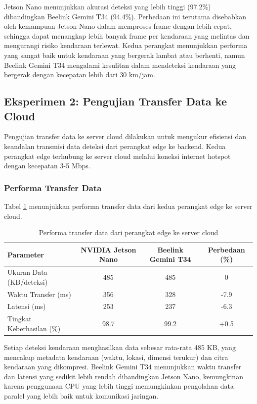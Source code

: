 Jetson Nano menunjukkan akurasi deteksi yang lebih tinggi (97.2\%) dibandingkan Beelink Gemini T34 (94.4\%). Perbedaan ini terutama disebabkan oleh kemampuan Jetson Nano dalam memproses frame dengan lebih cepat, sehingga dapat menangkap lebih banyak frame per kendaraan yang melintas dan mengurangi risiko kendaraan terlewat. Kedua perangkat menunjukkan performa yang sangat baik untuk kendaraan yang bergerak lambat atau berhenti, namun Beelink Gemini T34 mengalami kesulitan dalam mendeteksi kendaraan yang bergerak dengan kecepatan lebih dari 30 km/jam.

\subsection{Eksperimen 2: Pengujian Transfer Data ke Cloud}
\label{sec:eksperimen2}

Pengujian transfer data ke server cloud dilakukan untuk mengukur efisiensi dan keandalan transmisi data deteksi dari perangkat edge ke backend. Kedua perangkat edge terhubung ke server cloud melalui koneksi internet hotspot dengan kecepatan 3-5 Mbps.

\subsubsection{Performa Transfer Data}

Tabel \ref{tab:data_transfer} menunjukkan performa transfer data dari kedua perangkat edge ke server cloud.

\begin{table}[htbp]
  \centering
  \begin{tabular}{|l|c|c|c|}
  \hline
  \rowcolor[HTML]{C0C0C0}
  \textbf{Parameter} & \textbf{NVIDIA Jetson Nano} & \textbf{Beelink Gemini T34} & \textbf{Perbedaan (\%)} \\
  \hline
  Ukuran Data (KB/deteksi) & 485 & 485 & 0 \\
  \hline
  Waktu Transfer (ms) & 356 & 328 & -7.9 \\
  \hline
  Latensi (ms) & 253 & 237 & -6.3 \\
  \hline
  Tingkat Keberhasilan (\%) & 98.7 & 99.2 & +0.5 \\
  \hline
  \end{tabular}
  \caption{Performa transfer data dari perangkat edge ke server cloud}
  \label{tab:data_transfer}
\end{table}

Setiap deteksi kendaraan menghasilkan data sebesar rata-rata 485 KB, yang mencakup metadata kendaraan (waktu, lokasi, dimensi terukur) dan citra kendaraan yang dikompresi. Beelink Gemini T34 menunjukkan waktu transfer dan latensi yang sedikit lebih rendah dibandingkan Jetson Nano, kemungkinan karena penggunaan CPU yang lebih tinggi memungkinkan pengolahan data paralel yang lebih baik untuk komunikasi jaringan.

